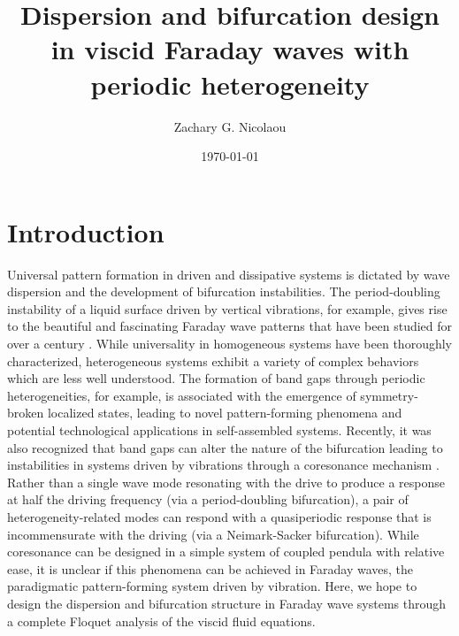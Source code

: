 \documentclass[aps,pre,amsmath,amssymb,floatfix,onecolumn,notitlepage,10pt]{revtex4-1}
\begin{document}
\title{Dispersion and bifurcation design in viscid Faraday waves with periodic heterogeneity}
\author{Zachary G. Nicolaou}
\date{\today}

\maketitle

\section{Introduction}
Universal pattern formation in driven and dissipative systems is dictated by wave dispersion and the development of bifurcation instabilities. The period-doubling instability of a liquid surface driven by vertical vibrations, for example, gives rise to the beautiful and fascinating Faraday wave patterns that have been studied for over a century \cite{2021_Nicolaou_1}. While universality in homogeneous systems have been thoroughly characterized, heterogeneous systems exhibit a variety of complex behaviors which are less well understood. The formation of band gaps through periodic heterogeneities, for example, is associated with the emergence of symmetry-broken localized states, leading to novel pattern-forming phenomena and potential technological applications in self-assembled systems. Recently, it was also recognized that band gaps can alter the nature of the bifurcation leading to instabilities in systems driven by vibrations through a coresonance mechanism \cite{2021_Nicolaou_2}. Rather than a single wave mode resonating with the drive to produce a response at half the driving frequency (via a period-doubling bifurcation), a pair of heterogeneity-related modes can respond with a quasiperiodic response that is incommensurate with the driving (via a Neimark-Sacker bifurcation). While coresonance can be designed in a simple system of coupled pendula with relative ease, it is unclear if this phenomena can be achieved in Faraday waves, the paradigmatic pattern-forming system driven by vibration. Here, we hope to design the dispersion and bifurcation structure in Faraday wave systems through a complete Floquet  analysis of the viscid fluid equations.
\end{document}

